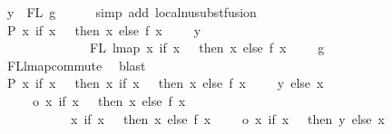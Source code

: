\begin{isabellebody}
\ {\isachardoublequoteopen}y\ {\isasymin}\ FL\ g{\isachardoublequoteclose}\isanewline
\ \ \ \ \isamarkupfalse%
\ {\isacharparenleft}{\kern0pt}simp\ add{\isacharcolon}{\kern0pt}\ local{\isachardot}{\kern0pt}nu{\isacharunderscore}{\kern0pt}subst{\isacharunderscore}{\kern0pt}fusion{}{\isacharparenright}{\kern0pt}\isanewline
\ \ \isamarkupfalse%
\ \isamarkupfalse%
\ P{}{\isacharcolon}{\kern0pt}\ {\isachardoublequoteopen}{\isacharparenleft}{\kern0pt}{\isasymlambda}x{\isachardot}{\kern0pt}\ if\ x\ {\isacharequal}{\kern0pt}\ {}\ then\ x\ else\ f\ {\isacharparenleft}{\kern0pt}x\ {\isacharminus}{\kern0pt}\ {}{\isacharparenright}{\kern0pt}\ {\isacharplus}{\kern0pt}\ {}{\isacharparenright}{\kern0pt}\ y\isanewline
\ \ \ \ \ \ \ \ \ \ \ \ \ {\isasymin}\ FL\ {\isacharparenleft}{\kern0pt}lmap\ {\isacharparenleft}{\kern0pt}{\isasymlambda}x{\isachardot}{\kern0pt}\ if\ x\ {\isacharequal}{\kern0pt}\ {}\ then\ x\ else\ f\ {\isacharparenleft}{\kern0pt}x\ {\isacharminus}{\kern0pt}\ {}{\isacharparenright}{\kern0pt}\ {\isacharplus}{\kern0pt}\ {}{\isacharparenright}{\kern0pt}\ g{\isacharparenright}{\kern0pt}{\isachardoublequoteclose}\isanewline
\ \ \ \ \isamarkupfalse%
\ FL{\isacharunderscore}{\kern0pt}lmap{\isacharunderscore}{\kern0pt}commute\ \isamarkupfalse%
\ blast\isanewline
\isanewline
\ \ \isamarkupfalse%
\ P{}{\isacharcolon}{\kern0pt}\ {\isachardoublequoteopen}{\isacharparenleft}{\kern0pt}{\isasymlambda}x{\isachardot}{\kern0pt}\ if\ x\ {\isacharequal}{\kern0pt}\ {}\ then\ {\isacharparenleft}{\kern0pt}{\isasymlambda}x{\isachardot}{\kern0pt}\ if\ x\ {\isacharequal}{\kern0pt}\ {}\ then\ x\ else\ f\ {\isacharparenleft}{\kern0pt}x\ {\isacharminus}{\kern0pt}\ {}{\isacharparenright}{\kern0pt}\ {\isacharplus}{\kern0pt}\ {}{\isacharparenright}{\kern0pt}\ y\ else\ x{\isacharparenright}{\kern0pt}\isanewline
\ \ \ \ \ o\ {\isacharparenleft}{\kern0pt}{\isasymlambda}x{\isachardot}{\kern0pt}\ if\ x\ {\isacharequal}{\kern0pt}\ {}\ then\ x\ else\ f\ {\isacharparenleft}{\kern0pt}x\ {\isacharminus}{\kern0pt}\ {}{\isacharparenright}{\kern0pt}\ {\isacharplus}{\kern0pt}\ {}{\isacharparenright}{\kern0pt}\ {\isacharequal}{\kern0pt}\isanewline
\ \ \ \ \ \ \ \ \ \ \ {\isacharparenleft}{\kern0pt}{\isasymlambda}x{\isachardot}{\kern0pt}\ if\ x\ {\isacharequal}{\kern0pt}\ {}\ then\ x\ else\ f\ {\isacharparenleft}{\kern0pt}x\ {\isacharminus}{\kern0pt}\ {}{\isacharparenright}{\kern0pt}\ {\isacharplus}{\kern0pt}\ {}{\isacharparenright}{\kern0pt}\ o\ {\isacharparenleft}{\kern0pt}{\isasymlambda}x{\isachardot}{\kern0pt}\ if\ x\ {\isacharequal}{\kern0pt}\ {}\ then\ y\ else\ x{\isacharparenright}{\kern0pt}{\isachardoublequoteclose}\isanewline

\end{isabellebody}

